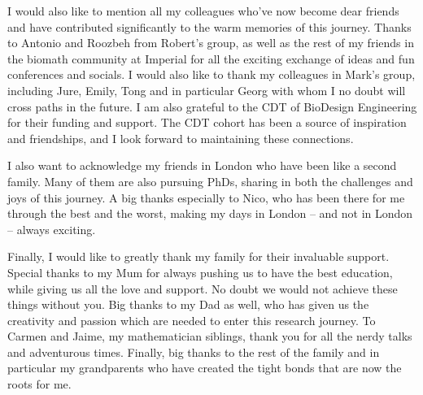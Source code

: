 \documentclass[
    11pt,
    oneside, %
    english,
    onehalfspacing, %
parskip, %
]{PhDDoctoralThesis}
\begin{document}
        I would also like to mention all my colleagues who've now become dear friends and have contributed significantly to the warm memories of this journey.
       Thanks to Antonio and Roozbeh from Robert's group, as well as the rest of my friends in the biomath community at Imperial for all the exciting exchange of ideas and fun conferences and socials.
       I would also like to thank my colleagues in Mark's group, including Jure, Emily, Tong and in particular Georg with whom I no doubt will cross paths in the future. I am also grateful to the CDT of BioDesign Engineering for their funding and support.
       The CDT cohort has been a source of inspiration and friendships, and I look forward to maintaining these connections.

       I also want to acknowledge my friends in London who have been like a second family.
       Many of them are also pursuing PhDs, sharing in both the challenges and joys of this journey.
       A big thanks especially to Nico, who has been there for me through the best and the worst, making my days in London – and not in London – always exciting.


Finally, I would like to greatly thank my family for their invaluable support.
       Special thanks to my Mum for always pushing us to have the best education, while giving us all the love and support.
       No doubt we would not achieve these things without you.
       Big thanks to my Dad as well, who has given us the creativity and passion which are needed to enter this research journey.
       To Carmen and Jaime, my mathematician siblings, thank you for all the nerdy talks and adventurous times.
       Finally, big thanks to the rest of the family and in particular my grandparents who have created the tight bonds that are now the roots for me.



    \tableofcontents





    \mainmatter %

    \pagestyle{thesis} %

    \clearpage

    
    
    
    
    
    

    \printglossary[type=\acronymtype]

    \printbibliography[heading=bibintoc]
    
\end{document}
